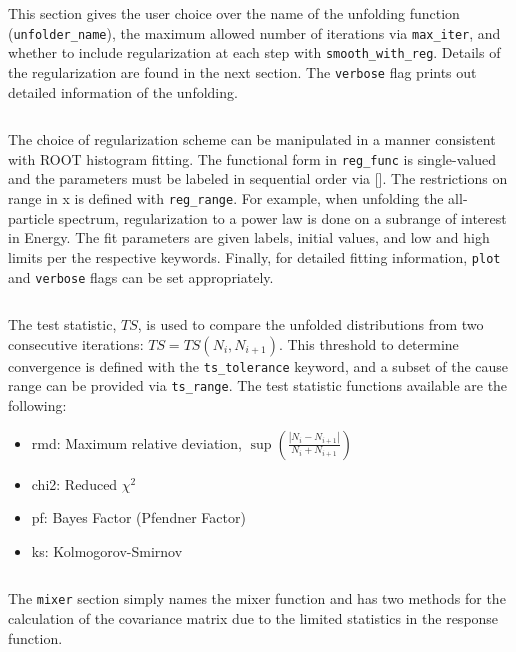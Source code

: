 \noindent\hrulefill

\inputminted[firstline=29,lastline=34]{ini}{code/unfoldConfig.cfg}
This section gives the user choice over the name of the unfolding function (\verb|unfolder_name|), 
the maximum allowed number of iterations via \verb|max_iter|,
and whether to include regularization at each step with \verb|smooth_with_reg|.
Details of the regularization are found in the next section.
The \verb|verbose| flag prints out detailed information of the unfolding.



\noindent\hrulefill

\inputminted[firstline=36,lastline=48]{ini}{code/unfoldConfig.cfg}
The choice of regularization scheme can be manipulated in a manner consistent with ROOT histogram fitting.
The functional form in \verb|reg_func| is single-valued and the parameters must be labeled in sequential order via [].
The restrictions on range in x is defined with \verb|reg_range|. 
For example, when unfolding the all-particle spectrum, regularization to a power law is done on a subrange of interest in Energy.
The fit parameters are given labels, initial values, and low and high limits per the respective keywords.
Finally, for detailed fitting information, \verb|plot| and \verb|verbose| flags can be set appropriately.


\noindent\hrulefill

\inputminted[firstline=50,lastline=57]{ini}{code/unfoldConfig.cfg}
The test statistic, $TS$, is used to compare the unfolded distributions from two consecutive iterations: $TS = TS(N_{i},N_{i+1})$.
This threshold to determine convergence is defined with the \verb|ts_tolerance| keyword,
and a subset of the cause range can be provided via \verb|ts_range|.
The test statistic functions available are the following:

\begin{itemize}
  \item rmd: Maximum relative deviation, $\sup(\frac{|N_{i}-N_{i+1}|}{N_{i}+N_{i+1}})$
  \item chi2: Reduced $\chi^{2}$
  \item pf: Bayes Factor (Pfendner Factor) \cite{pfenderfactor}
  \item ks: Kolmogorov-Smirnov
\end{itemize}


\noindent\hrulefill

\inputminted[firstline=59,lastline=62]{ini}{code/unfoldConfig.cfg}
The \verb|mixer| section simply names the mixer function and has two methods for the calculation 
of the covariance matrix due to the limited statistics in the response function.


